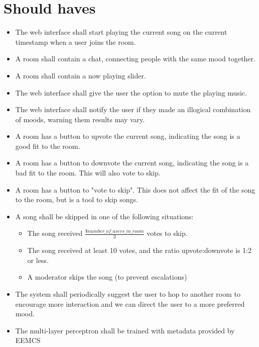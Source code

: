 \section{Should haves}
\begin{itemize}
\item The web interface shall start playing the current song on the current timestamp when a user joins the room.

\item A room shall contain a chat, connecting people with the same mood together.

\item A room shall contain a now playing slider.

\item The web interface shall give the user the option to mute the playing music.

\item The web interface shall notify the user if they made an illogical combination of moods, warning them results may vary.

\item A room has a button to upvote the current song, indicating the song is a good fit to the room.

\item A room has a button to downvote the current song, indicating the song is a bad fit to the room. This will also vote to skip.

\item A room has a button to "vote to skip". This does not affect the fit of the song to the room, but is a tool to skip songs.

\item A song shall be skipped in one of the following situations:
	\begin{itemize}
	\item The song received $\frac{\$number\_of\_users\_in\_room}{3}$ votes to skip.
	\item The song received at least 10 votes, and the ratio upvote:downvote is 1:2 or less.
	\item A moderator skips the song (to prevent escalations)
	\end{itemize}
	
\item The system shall periodically suggest the user to hop to another room to encourage more interaction and we can direct the user to a more preferred mood.

\item The multi-layer perceptron shall be trained with metadata provided by EEMCS


\end{itemize}
